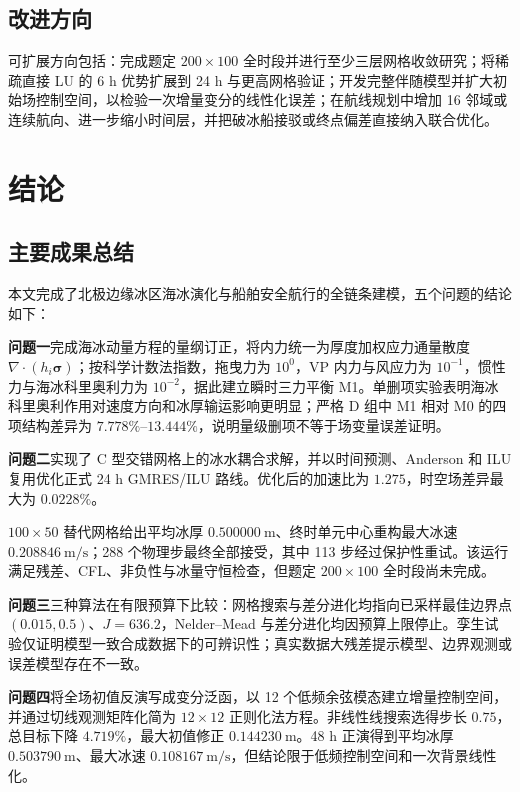 \documentclass[UTF8,fontset=none]{ctexart}
\newcommand{\vect}[1]{\boldsymbol{#1}}
\begin{document}
\subsection{改进方向}

可扩展方向包括：完成题定 $200\times100$ 全时段并进行至少三层网格收敛研究；将稀疏直接 LU 的 6 h 优势扩展到 24 h 与更高网格验证；开发完整伴随模型并扩大初始场控制空间，以检验一次增量变分的线性化误差；在航线规划中增加 16 邻域或连续航向、进一步缩小时间层，并把破冰船接驳或终点偏差直接纳入联合优化。

\section{结论}

\subsection{主要成果总结}

本文完成了北极边缘冰区海冰演化与船舶安全航行的全链条建模，五个问题的结论如下：

\par \textbf{问题一}完成海冰动量方程的量纲订正，将内力统一为厚度加权应力通量散度 $\nabla\cdot(h_i\vect\sigma)$；按科学计数法指数，拖曳力为 $10^0$，VP 内力与风应力为 $10^{-1}$，惯性力与海冰科里奥利力为 $10^{-2}$，据此建立瞬时三力平衡 M1。单删项实验表明海冰科里奥利作用对速度方向和冰厚输运影响更明显；严格 D 组中 M1 相对 M0 的四项结构差异为 $7.778\%$--$13.444\%$，说明量级删项不等于场变量误差证明。

\par \textbf{问题二}实现了 C 型交错网格上的冰水耦合求解，并以时间预测、Anderson 和 ILU 复用优化正式 24 h GMRES/ILU 路线。优化后的加速比为 $1.275$，时空场差异最大为 $0.0228\%$。

$100\times50$ 替代网格给出平均冰厚 $0.500000\ \mathrm m$、终时单元中心重构最大冰速 $0.208846\ \mathrm{m/s}$；288 个物理步最终全部接受，其中 113 步经过保护性重试。该运行满足残差、CFL、非负性与冰量守恒检查，但题定 $200\times100$ 全时段尚未完成。

\par \textbf{问题三}三种算法在有限预算下比较：网格搜索与差分进化均指向已采样最佳边界点 $(0.015,0.5)$、$J=636.2$，Nelder--Mead 与差分进化均因预算上限停止。孪生试验仅证明模型一致合成数据下的可辨识性；真实数据大残差提示模型、边界观测或误差模型存在不一致。

\par \textbf{问题四}将全场初值反演写成变分泛函，以 12 个低频余弦模态建立增量控制空间，并通过切线观测矩阵化简为 $12\times12$ 正则化法方程。非线性线搜索选得步长 $0.75$，总目标下降 $4.719\%$，最大初值修正 $0.144230\ \mathrm m$。48 h 正演得到平均冰厚 $0.503790\ \mathrm m$、最大冰速 $0.108167\ \mathrm{m/s}$，但结论限于低频控制空间和一次背景线性化。
\end{document}
